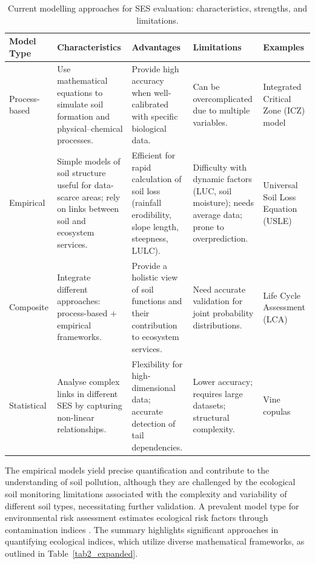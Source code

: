 \documentclass[land,article,submit,pdftex,moreauthors]{Definitions/mdpi}
\begin{document}
\begin{table}[H]
\caption{Current modelling approaches for SES evaluation: characteristics,
    strengths, and limitations.\label{tab3}}
\begin{tabularx}{\textwidth}{@{} p{1.6cm} p{2.7cm} p{2.5cm} p{3.0cm} X @{}}
\toprule
\textbf{Model Type} & \textbf{Characteristics} & \textbf{Advantages}
    & \textbf{Limitations} & \textbf{Examples} \\
\midrule
Process-based
    & Use mathematical equations to simulate soil formation and
      physical--chemical processes.
    & Provide high accuracy when well-calibrated with specific biological
      data.
    & Can be overcomplicated due to multiple variables.
    & Integrated Critical Zone (ICZ) model \cite{Giannakis2017} \\[6pt]
Empirical
    & Simple models of soil structure useful for data-scarce areas; rely on
      links between soil and ecosystem services.
    & Efficient for rapid calculation of soil loss (rainfall erodibility,
      slope length, steepness, LULC).
    & Difficulty with dynamic factors (LUC, soil moisture); needs average
      data; prone to overprediction.
    & Universal Soil Loss Equation (USLE) \cite{Benavidez2018} \\[6pt]
Composite
    & Integrate different approaches: process-based $+$ empirical
      frameworks.
    & Provide a holistic view of soil functions and their contribution to
      ecosystem services.
    & Need accurate validation for joint probability distributions.
    & Life Cycle Assessment (LCA) \cite{Sadhukhan2022} \\[6pt]
Statistical
    & Analyse complex links in different SES by capturing non-linear
      relationships.
    & Flexibility for high-dimensional data; accurate detection of tail
      dependencies.
    & Lower accuracy; requires large datasets; structural complexity.
    & Vine copulas \cite{Luetal2020} \\
\bottomrule
\end{tabularx}
\end{table}

The empirical models yield precise quantification and contribute to the
understanding of soil pollution, although they are challenged by the ecological
soil monitoring limitations associated with the complexity and variability of
different soil types, necessitating further validation. A prevalent model type
for environmental risk assessment estimates ecological risk factors through
contamination indices
\cite{Stojic2019,Mohammad2025,Sun2025,Edo2024,Chon2011,Ferreira2022}. The
summary highlights significant approaches in quantifying ecological indices,
which utilize diverse mathematical frameworks, as outlined in
Table~\ref{tab2_expanded}.
\end{document}
